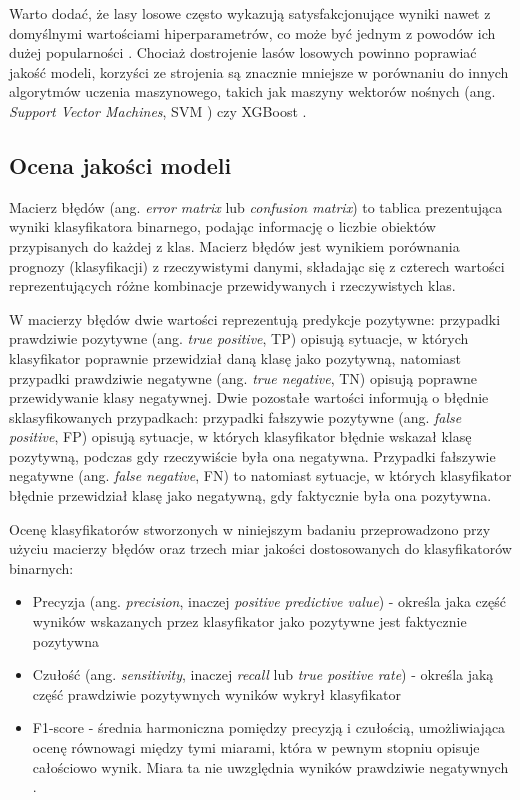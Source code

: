 \documentclass{amuthesis}
\begin{document}
Warto dodać, że lasy losowe często wykazują satysfakcjonujące wyniki
nawet z domyślnymi wartościami hiperparametrów, co może być jednym z
powodów ich dużej popularności \autocite{lovelace_2019_geocomputation}.
Chociaż dostrojenie lasów losowych powinno poprawiać jakość modeli,
korzyści ze strojenia są znacznie mniejsze w porównaniu do innych
algorytmów uczenia maszynowego, takich jak maszyny wektorów nośnych
(ang. \emph{Support Vector Machines}, SVM \autocite{svm})
\autocite{probst_2019_hyperparameters} czy XGBoost \autocite{xgboost}.

\hypertarget{sec-model-quality-assessment}{%
\subsection{Ocena jakości modeli}\label{sec-model-quality-assessment}}

Macierz błędów (ang. \emph{error matrix} lub \emph{confusion matrix}) to
tablica prezentująca wyniki klasyfikatora binarnego, podając informację
o liczbie obiektów przypisanych do każdej z klas. Macierz błędów jest
wynikiem porównania prognozy (klasyfikacji) z rzeczywistymi danymi,
składając się z czterech wartości reprezentujących różne kombinacje
przewidywanych i rzeczywistych klas.

W macierzy błędów dwie wartości reprezentują predykcje pozytywne:
przypadki prawdziwie pozytywne (ang. \emph{true positive}, TP) opisują
sytuacje, w których klasyfikator poprawnie przewidział daną klasę jako
pozytywną, natomiast przypadki prawdziwie negatywne (ang. \emph{true
negative}, TN) opisują poprawne przewidywanie klasy negatywnej. Dwie
pozostałe wartości informują o błędnie sklasyfikowanych przypadkach:
przypadki fałszywie pozytywne (ang. \emph{false positive}, FP) opisują
sytuacje, w których klasyfikator błędnie wskazał klasę pozytywną,
podczas gdy rzeczywiście była ona negatywna. Przypadki fałszywie
negatywne (ang. \emph{false negative}, FN) to natomiast sytuacje, w
których klasyfikator błędnie przewidział klasę jako negatywną, gdy
faktycznie była ona pozytywna.

Ocenę klasyfikatorów stworzonych w niniejszym badaniu przeprowadzono
przy użyciu macierzy błędów oraz trzech miar jakości dostosowanych do
klasyfikatorów binarnych:

\begin{itemize}
\item
  Precyzja (ang. \emph{precision}, inaczej \emph{positive predictive
  value}) - określa jaka część wyników wskazanych przez klasyfikator
  jako pozytywne jest faktycznie pozytywna
  \autocite{jaworski_2013_perfomance_measures}
\item
  Czułość (ang. \emph{sensitivity}, inaczej \emph{recall} lub \emph{true
  positive rate}) - określa jaką część prawdziwie pozytywnych wyników
  wykrył klasyfikator \autocite{jaworski_2013_perfomance_measures}
\item
  F1-score - średnia harmoniczna pomiędzy precyzją i czułością,
  umożliwiająca ocenę równowagi między tymi miarami, która w pewnym
  stopniu opisuje całościowo wynik. Miara ta nie uwzględnia wyników
  prawdziwie negatywnych \autocite{zygierewicz_2021_ml}.
\end{itemize}
\end{document}
